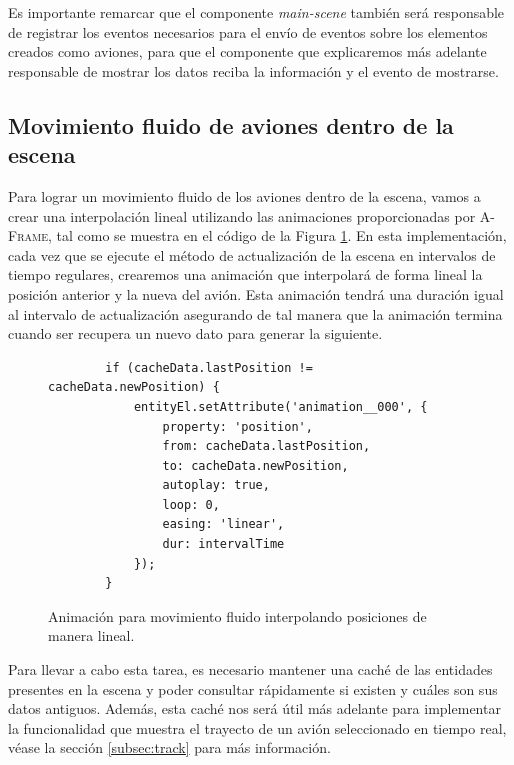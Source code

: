 \documentclass[a4paper, 11pt]{book}
\begin{document}
Es importante remarcar que el componente \emph{main-scene} también será responsable de registrar los eventos necesarios para el envío de eventos sobre los elementos creados como aviones, para que el componente que explicaremos más adelante responsable de mostrar los datos reciba la información y el evento de mostrarse.

\subsection{Movimiento fluido de aviones dentro de la escena}
\label{subsec:movimientoFluido}
Para lograr un movimiento fluido de los aviones dentro de la escena, vamos a crear una interpolación lineal utilizando las animaciones proporcionadas por \textsc{A-Frame}, tal como se muestra en el código de la Figura \ref{codigo:movimientoFluido}. En esta implementación, cada vez que se ejecute el método de actualización de la escena en intervalos de tiempo regulares, crearemos una animación que interpolará de forma lineal la posición anterior y la nueva del avión. Esta animación tendrá una duración igual al intervalo de actualización asegurando de tal manera que la animación termina cuando ser recupera un nuevo dato para generar la siguiente.
\begin{figure}[h]
	\centering
	\begin{verbatim}
		if (cacheData.lastPosition != cacheData.newPosition) {
			entityEl.setAttribute('animation__000', {
				property: 'position',
				from: cacheData.lastPosition,
				to: cacheData.newPosition,
				autoplay: true,
				loop: 0,
				easing: 'linear',
				dur: intervalTime
			});
		}
	\end{verbatim}
	\caption{Animación para movimiento fluido interpolando posiciones de manera lineal.
		\label{codigo:movimientoFluido}}
\end{figure}

Para llevar a cabo esta tarea, es necesario mantener una caché de las entidades presentes en la escena y poder consultar rápidamente si existen y cuáles son sus datos antiguos. Además, esta caché nos será útil más adelante para implementar la funcionalidad que muestra el trayecto de un avión seleccionado en tiempo real, véase la sección \ref{subsec:track} para más información.
\end{document}
